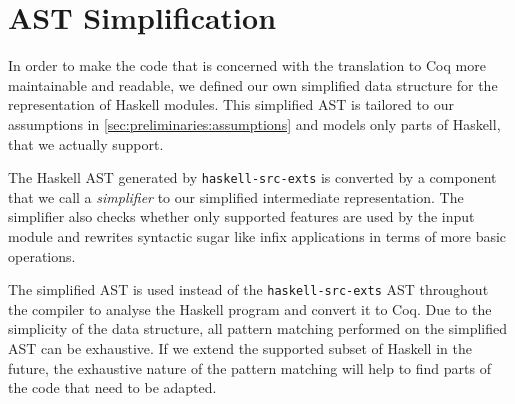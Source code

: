 \section{AST Simplification} \label{sec:implementation:simplification}
In order to make the code that is concerned with the translation to Coq more maintainable and readable, we defined our own simplified data structure for the representation of Haskell modules.
This simplified AST is tailored to our assumptions in \autoref{sec:preliminaries:assumptions} and models only parts of Haskell, that we actually support.

The Haskell AST generated by \texttt{haskell-src-exts} is converted by a component that we call a \textit{simplifier} to our simplified intermediate representation.
The simplifier also checks whether only supported features are used by the input module and rewrites syntactic sugar like infix applications in terms of more basic operations.

The simplified AST is used instead of the \texttt{haskell-src-exts} AST throughout the compiler to analyse the Haskell program and convert it to Coq.
Due to the simplicity of the data structure, all pattern matching performed on the simplified AST can be exhaustive.
If we extend the supported subset of Haskell in the future, the exhaustive nature of the pattern matching will help to find parts of the code that need to be adapted.
